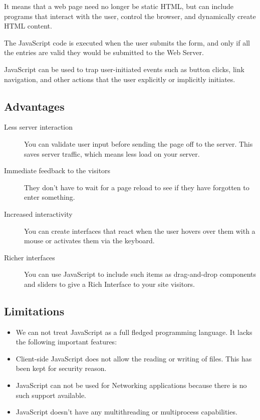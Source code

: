 \documentclass[11pt,a4paper]{article}
\begin{document}
It means that a web page need no longer be static HTML, but can include programs that interact with the user, control the browser, and dynamically create HTML content.

The JavaScript code is executed when the user submits the form, and only if all the entries are valid they would be submitted to the Web Server.

JavaScript can be used to trap user-initiated events such as button clicks, link navigation, and other actions that the user explicitly or implicitly initiates.

\subsection*{Advantages}
\begin{description}
\item[Less server interaction] You can validate user input before sending the page off to the server. This saves server traffic, which means less load on your server.
\item[Immediate feedback to the visitors] They don't have to wait for a page reload to see if they have forgotten to enter something.
\item[Increased interactivity] You can create interfaces that react when the user hovers over them with a mouse or activates them via the keyboard.
\item[Richer interfaces] You can use JavaScript to include such items as drag-and-drop components and sliders to give a Rich Interface to your site visitors.
\end{description}

\subsection*{Limitations}
\begin{itemize}
\item We can not treat JavaScript as a full fledged programming language. It lacks the following important features:
\item Client-side JavaScript does not allow the reading or writing of files. This has been kept for security reason.
\item JavaScript can not be used for Networking applications because there is no such support available.
\item JavaScript doesn't have any multithreading or multiprocess capabilities.
\end{itemize}
\end{document}
